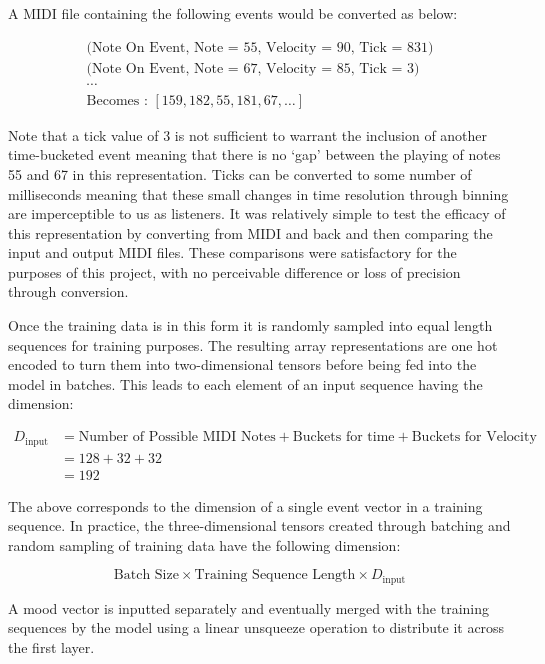 \documentclass[12pt,]{article}
\begin{document}
A MIDI file containing the following events would be converted as below:

\[\begin{gathered}
\text{(Note On Event, Note = 55, Velocity = 90, Tick = 831)} \\
\text{(Note On Event, Note = 67, Velocity = 85, Tick = 3)}\\
\cdots\\
\text{Becomes : } [159, 182, 55, 181, 67, \dots]
\end{gathered}\]

Note that a tick value of 3 is not sufficient to warrant the inclusion
of another time-bucketed event meaning that there is no `gap' between
the playing of notes 55 and 67 in this representation. Ticks can be
converted to some number of milliseconds meaning that these small
changes in time resolution through binning are imperceptible to us as
listeners. It was relatively simple to test the efficacy of this
representation by converting from MIDI and back and then comparing the
input and output MIDI files. These comparisons were satisfactory for the
purposes of this project, with no perceivable difference or loss of
precision through conversion.

Once the training data is in this form it is randomly sampled into equal
length sequences for training purposes. The resulting array
representations are one hot encoded to turn them into two-dimensional
tensors before being fed into the model in batches. This leads to each
element of an input sequence having the dimension:

\[\begin{aligned}
D_{\text{input}} &= \text{Number of Possible MIDI Notes} + \text{Buckets for time} + \text{Buckets for Velocity}\\
&= 128 + 32 + 32\\
&= 192
\end{aligned}\]

The above corresponds to the dimension of a single event vector in a
training sequence. In practice, the three-dimensional tensors created
through batching and random sampling of training data have the following
dimension:

\[\text{Batch Size} \times \text{Training Sequence Length} \times D_{\text{input}}\]

A mood vector is inputted separately and eventually merged with the
training sequences by the model using a linear unsqueeze operation to
distribute it across the first layer.
\end{document}
